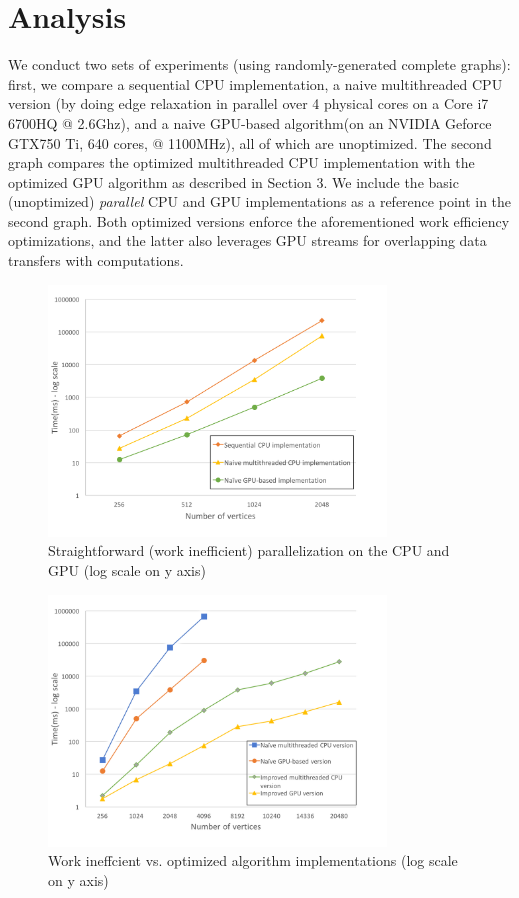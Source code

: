 \documentclass[11pt,a4paper, final, twoside]{article}
\theoremstyle{proposition}
\theoremstyle{definition}
\theoremstyle{remark}
\numberwithin{equation}{section}
\begin{document}
\section{Analysis}\label{I4}
We conduct two sets of experiments (using randomly-generated complete graphs): first, we compare a
sequential CPU implementation, a naive multithreaded CPU version (by doing edge relaxation in parallel over 4 physical cores on a Core i7 6700HQ @ 2.6Ghz), and a naive GPU-based algorithm(on an NVIDIA Geforce GTX750 Ti, 640 cores, @ 1100MHz), all of which are unoptimized. The second graph compares the optimized multithreaded CPU implementation with the optimized GPU algorithm as described in Section 3. We include the basic (unoptimized) \textit{parallel} CPU and GPU implementations as a reference point in the second graph. Both optimized versions enforce the aforementioned work efficiency optimizations, and the latter also leverages GPU streams for overlapping data transfers with computations.\newline
\begin{figure}[h]

\centering
\includegraphics[width=0.8\textwidth]{fig1}
\caption{Straightforward (work inefficient) parallelization on the CPU and GPU (log scale on y axis)}
\end{figure}


\begin{figure}[h]

\centering
\includegraphics[width=0.8\textwidth]{fig2}
\caption{Work ineffcient vs. optimized algorithm implementations (log scale on y axis)}
\label{ab}
\end{figure}
\end{document}
